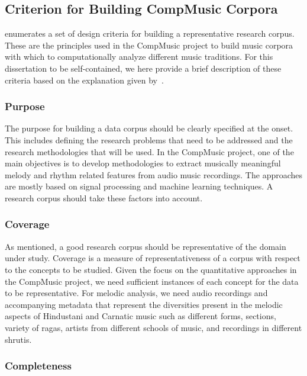 \subsection{Criterion for Building CompMusic Corpora}
\label{sec:corpus_criterion_for_corpora}

\cite{serra:14:corpus} enumerates a set of design criteria for building a representative research corpus. These are the principles used in the CompMusic project to build music corpora with which to computationally analyze different music traditions. For this dissertation to be self-contained, we here provide a brief description of these criteria based on the explanation given by~\cite{serra:14:corpus}.

\subsubsection{Purpose}

The purpose for building a data corpus should be clearly specified at the onset. This includes defining the research problems that need to be addressed and the research methodologies that will be used. In the CompMusic project, one of the main objectives is to develop methodologies to extract musically meaningful melody and rhythm related features from audio music recordings. The approaches are mostly based on signal processing and machine learning techniques. A research corpus should take these factors into account.

\subsubsection{Coverage}

As mentioned, a good research corpus should be representative of the domain under study. Coverage is a measure of representativeness of a corpus with respect to the concepts to be studied. Given the focus on the quantitative approaches in the CompMusic project, we need sufficient instances of each concept for the data to be representative. For melodic analysis, we need audio recordings and accompanying metadata that represent the diversities present in the melodic aspects of Hindustani and Carnatic music such as different forms, sections, variety of \glspl{raga}, artists from different schools of music, and recordings in different \glspl{shruti}. 

\subsubsection{Completeness}

